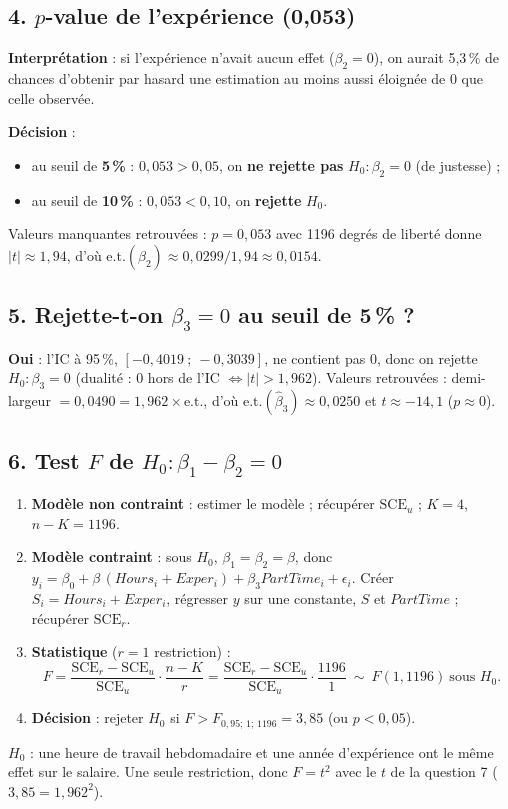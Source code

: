 \documentclass[11pt,a4paper]{article}
\begin{document}
\subsection*{4. $p$-value de l'expérience (0,053)}
\begin{reponse}
\textbf{Interprétation} : si l'expérience n'avait aucun effet ($\beta_2=0$), on aurait 5,3\,\% de chances d'obtenir par hasard une estimation au moins aussi éloignée de 0 que celle observée.

\textbf{Décision} :
\begin{itemize}[nosep]
\item au seuil de \textbf{5\,\%} : $0{,}053>0{,}05$, on \textbf{ne rejette pas} $H_0:\beta_2=0$ (de justesse) ;
\item au seuil de \textbf{10\,\%} : $0{,}053<0{,}10$, on \textbf{rejette} $H_0$.
\end{itemize}
Valeurs manquantes retrouvées : $p=0{,}053$ avec 1196 degrés de liberté donne $|t|\approx1{,}94$, d'où $\text{e.t.}(\hat\beta_2)\approx0{,}0299/1{,}94\approx0{,}0154$.
\end{reponse}

\subsection*{5. Rejette-t-on $\beta_3=0$ au seuil de 5\,\% ?}
\begin{reponse}
\textbf{Oui} : l'IC à 95\,\%, $[-0{,}4019\ ;\ -0{,}3039]$, ne contient pas 0, donc on rejette $H_0:\beta_3=0$ (dualité : 0 hors de l'IC $\iff|t|>1{,}962$). Valeurs retrouvées : demi-largeur $=0{,}0490=1{,}962\times\text{e.t.}$, d'où $\text{e.t.}(\hat\beta_3)\approx0{,}0250$ et $t\approx-14{,}1$ ($p\approx0$).
\end{reponse}

\subsection*{6. Test $F$ de $H_0:\beta_1-\beta_2=0$}
\begin{enumerate}[nosep]
\item \textbf{Modèle non contraint} : estimer le modèle ; récupérer $\text{SCE}_u$ ; $K=4$, $n-K=1196$.
\item \textbf{Modèle contraint} : sous $H_0$, $\beta_1=\beta_2=\beta$, donc $y_i=\beta_0+\beta\,(Hours_i+Exper_i)+\beta_3PartTime_i+\epsilon_i$. Créer $S_i=Hours_i+Exper_i$, régresser $y$ sur une constante, $S$ et $PartTime$ ; récupérer $\text{SCE}_r$.
\item \textbf{Statistique} ($r=1$ restriction) :
\[
F=\frac{\text{SCE}_r-\text{SCE}_u}{\text{SCE}_u}\cdot\frac{n-K}{r}=\frac{\text{SCE}_r-\text{SCE}_u}{\text{SCE}_u}\cdot\frac{1196}{1}\ \sim\ F(1,1196)\ \text{sous }H_0 .
\]
\item \textbf{Décision} : rejeter $H_0$ si $F>F_{0{,}95;\,1;\,1196}=3{,}85$ (ou $p<0{,}05$).
\end{enumerate}
\begin{reponse}
$H_0$ : une heure de travail hebdomadaire et une année d'expérience ont le même effet sur le salaire. Une seule restriction, donc $F=t^2$ avec le $t$ de la question 7 ($3{,}85=1{,}962^2$).
\end{reponse}
\end{document}
